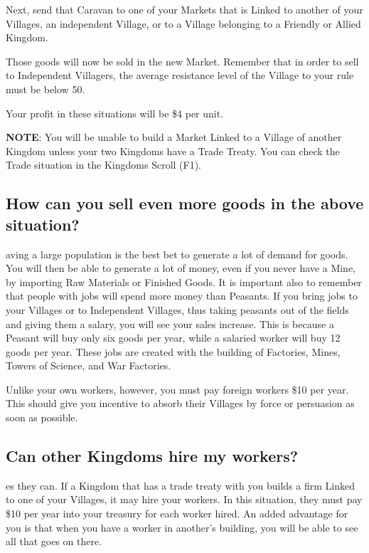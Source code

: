 Next, send that Caravan to one of your Markets that is Linked to another of your Villages, an independent Village, or to a Village belonging to a Friendly or Allied Kingdom.

Those goods will now be sold in the new Market. Remember that in order to sell to Independent Villagers, the average resistance level of the Village to your rule must be below 50.

Your profit in these situations will be \$4 per unit.

\textbf{NOTE}: You will be unable to build a Market Linked to a Village of another Kingdom unless your two Kingdoms have a Trade Treaty. You can check the Trade situation in the Kingdoms Scroll (F1).

\subsection{\textsf{How can you sell even more goods in the above situation?}}

aving a large population is the best bet to generate a lot of demand for goods. You will then be able to generate a lot of money, even if you never have a Mine, by importing Raw Materials or Finished Goods. It is important also to remember that people with jobs will spend more money than Peasants. If you bring jobs to your Villages or to Independent Villages, thus taking peasants out of the fields and giving them a salary, you will see your sales increase. This is because a Peasant will buy only six goods per year, while a salaried worker will buy 12 goods per year. These jobs are created with the building of Factories, Mines, Towers of Science, and War Factories.

Unlike your own workers, however, you must pay foreign workers \$10 per year. This should give you incentive to absorb their Villages by force or persuasion as soon as possible.

\subsection{\textsf{Can other Kingdoms hire my workers?}}

es they can. If a Kingdom that has a trade treaty with you builds a firm Linked to one of your Villages, it may hire your workers. In this situation, they must pay \$10 per year into your treasury for each worker hired. An added advantage for you is that when you have a worker in another’s building, you will be able to see all that goes on there.